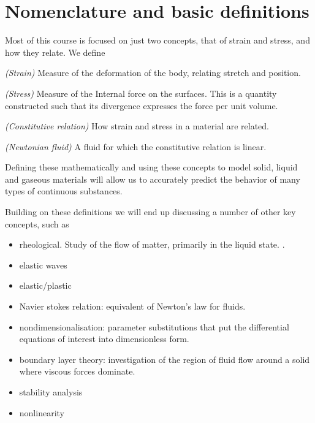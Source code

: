 
\section{Nomenclature and basic definitions}

Most of this course is focused on just two concepts, that of strain and stress, and how they relate.  We define

\begin{definition}
\emph{(Strain)} 
\label{dfn:continuumL2:30}
Measure of the deformation of the body, relating stretch and position.
\end{definition}

\begin{definition}
\emph{(Stress)} 
\label{dfn:continuumL2:10}
Measure of the Internal force on the surfaces.  This is a quantity constructed such that its divergence expresses the force per unit volume.
\end{definition}

\begin{definition}
\emph{(Constitutive relation)} 
\label{dfn:continuumL2:20}
How strain and stress in a material are related.
\end{definition}

\begin{definition}
\emph{(Newtonian fluid)} 
\label{dfn:continuumL2:40}
A fluid for which the constitutive relation is linear.
\end{definition}

Defining these mathematically and using these concepts to model solid, liquid and gaseous materials will allow us to accurately predict the behavior of many types of continuous substances.

Building on these definitions we will end up discussing a number of other key concepts, such as

\begin{itemize}
\item rheological.  Study of the flow of matter, primarily in the liquid state.  \citep{wiki:rheology}.
\item elastic waves
\item elastic/plastic
\item Navier stokes relation: equivalent of Newton's law for fluids.
\item nondimensionalisation: parameter substitutions that put the differential equations of interest into dimensionless form.
\item boundary layer theory: investigation of the region of fluid flow around a solid where viscous forces dominate.
\item stability analysis
\item nonlinearity 
\end{itemize}

